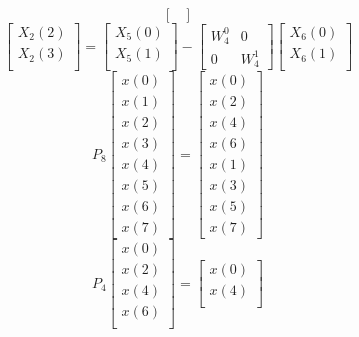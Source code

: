 \documentclass[journal,12pt,twocolumn]{IEEEtran}
\renewcommand\thesection{\arabic{section}}
\begin{document}
\begin{enumerate}[label=\arabic*.,ref=\thesection.\theenumi]
\begin{equation}
\begin{bmatrix}
\end{bmatrix}
\end{equation}
\begin{equation}
\begin{bmatrix}
X_{2}(2) \\ 
X_{2}(3)\\ 
\end{bmatrix}
=
\begin{bmatrix}
X_{5}(0) \\ 
X_{5}(1)\\ 
\end{bmatrix}
-
\begin{bmatrix}
W^{0}_{4} & 0\\
0 & W^{1}_{4}
\end{bmatrix}
\begin{bmatrix}
X_{6}(0) \\ 
X_{6}(1) \\ 
\end{bmatrix}
\end{equation}
\begin{equation}
P_{8}
\begin{bmatrix}
x(0) \\ 
x(1) \\ 
x(2) \\ 
x(3) \\ 
x(4) \\ 
x(5) \\
x(6) \\
x(7)
\end{bmatrix}
 = 
\begin{bmatrix}
x(0) \\ 
x(2) \\ 
x(4) \\ 
x(6) \\
x(1) \\ 
x(3) \\ 
x(5) \\
x(7)
\end{bmatrix}
\end{equation}
\begin{equation}
P_{4}
\begin{bmatrix}
x(0) \\ 
x(2) \\ 
x(4) \\ 
x(6) \\
\end{bmatrix}
 = 
\begin{bmatrix}
x(0) \\ 
x(4) \\ 

\end{bmatrix}
\end{equation}
\end{enumerate}
\end{document}
